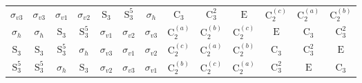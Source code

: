 \begin{tabular}{c|cccccccccccc}
$\sigma_{v3}$ & $\sigma_{v3}$ & $\sigma_{v1}$ & $\sigma_{v2}$ & $\mathrm{S}_{3}$ & $\mathrm{S}_{3}^{5}$ & $\sigma_{h}$ & $\mathrm{C}_{3}$ & $\mathrm{C}_{3}^{2}$ & $\mathrm{E}$ & $\mathrm{C}_{2}^{(c)}$ & $\mathrm{C}_{2}^{(a)}$ & $\mathrm{C}_{2}^{(b)}$ \\
$\sigma_{h}$ & $\sigma_{h}$ & $\mathrm{S}_{3}$ & $\mathrm{S}_{3}^{5}$ & $\sigma_{v1}$ & $\sigma_{v2}$ & $\sigma_{v3}$ & $\mathrm{C}_{2}^{(a)}$ & $\mathrm{C}_{2}^{(b)}$ & $\mathrm{C}_{2}^{(c)}$ & $\mathrm{E}$ & $\mathrm{C}_{3}$ & $\mathrm{C}_{3}^{2}$ \\
$\mathrm{S}_{3}$ & $\mathrm{S}_{3}$ & $\mathrm{S}_{3}^{5}$ & $\sigma_{h}$ & $\sigma_{v3}$ & $\sigma_{v1}$ & $\sigma_{v2}$ & $\mathrm{C}_{2}^{(c)}$ & $\mathrm{C}_{2}^{(a)}$ & $\mathrm{C}_{2}^{(b)}$ & $\mathrm{C}_{3}$ & $\mathrm{C}_{3}^{2}$ & $\mathrm{E}$ \\
$\mathrm{S}_{3}^{5}$ & $\mathrm{S}_{3}^{5}$ & $\sigma_{h}$ & $\mathrm{S}_{3}$ & $\sigma_{v2}$ & $\sigma_{v3}$ & $\sigma_{v1}$ & $\mathrm{C}_{2}^{(b)}$ & $\mathrm{C}_{2}^{(c)}$ & $\mathrm{C}_{2}^{(a)}$ & $\mathrm{C}_{3}^{2}$ & $\mathrm{E}$ & $\mathrm{C}_{3}$ \\
\bottomrule
\end{tabular}